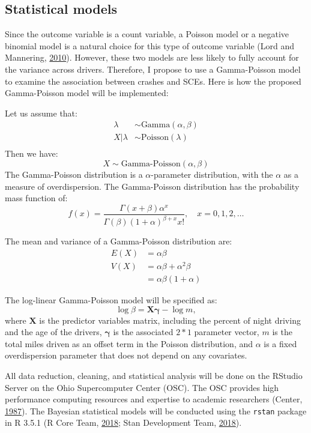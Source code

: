 \documentclass[12pt]{book}
\numberwithin{equation}{chapter}
\begin{document}
\hypertarget{statistical-models}{%
\subsection{Statistical models}\label{statistical-models}}

Since the outcome variable is a count variable, a Poisson model or a negative binomial model is a natural choice for this type of outcome variable (Lord and Mannering, \protect\hyperlink{ref-lord2010statistical}{2010}). However, these two models are less likely to fully account for the variance across drivers. Therefore, I propose to use a Gamma-Poisson model to examine the association between crashes and SCEs. Here is how the proposed Gamma-Poisson model will be implemented:

Let us assume that:
\[
\begin{aligned}
\lambda & \sim \text{Gamma}(\alpha, \beta)\\
X|\lambda & \sim \text{Poisson}(\lambda)\\
\end{aligned}
\]
Then we have:
\[X \sim \text{Gamma-Poisson}(\alpha, \beta)\]
The Gamma-Poisson distribution is a \(\alpha\)-parameter distribution, with the \(\alpha\) as a measure of overdispersion. The Gamma-Poisson distribution has the probability mass function of:
\[f(x) = \frac{\Gamma(x + \beta)\alpha^x}{\Gamma(\beta)(1 + \alpha)^{\beta + x}x!}, \quad x = 0, 1, 2, \dots\]

The mean and variance of a Gamma-Poisson distribution are:
\[
\begin{aligned}
E(X) & = \alpha\beta \\
V(X) & = \alpha\beta + \alpha^2\beta\\
     & = \alpha\beta(1 + \alpha)
\end{aligned}
\]

The log-linear Gamma-Poisson model will be specified as:
\[
\log\beta = \mathbf{X\gamma} - \log m,
\]
where \(\mathbf{X}\) is the predictor variables matrix, including the percent of night driving and the age of the drivers, \(\mathbf{\gamma}\) is the associated \(2*1\) parameter vector, \(m\) is the total miles driven as an offset term in the Poisson distribution, and \(\alpha\) is a fixed overdispersion parameter that does not depend on any covariates.

All data reduction, cleaning, and statistical analysis will be done on the RStudio Server on the Ohio Supercomputer Center (OSC). The OSC provides high performance computing resources and expertise to academic researchers (Center, \protect\hyperlink{ref-OSC1987}{1987}). The Bayesian statistical models will be conducted using the \texttt{rstan} package in R 3.5.1 (R Core Team, \protect\hyperlink{ref-Rcitation}{2018}; Stan Development Team, \protect\hyperlink{ref-rstancitation}{2018}).
\end{document}
